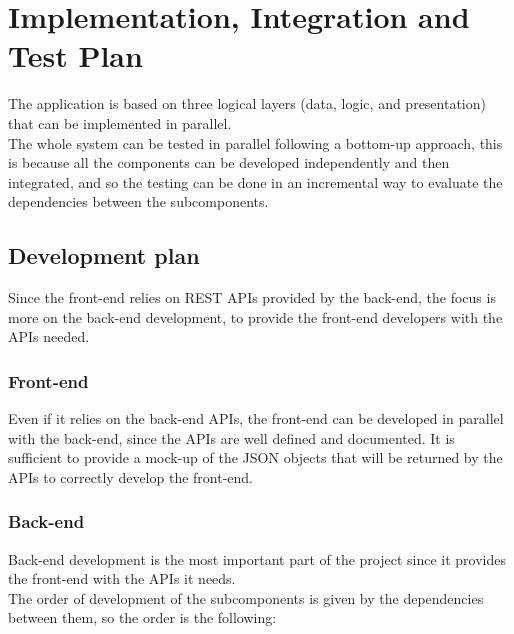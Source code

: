 \chapter{Implementation, Integration and Test Plan}
The application is based on three logical layers (data, logic, and presentation) that can be implemented in parallel.\\
The whole system can be tested in parallel following a bottom-up approach, this is because all the components can be developed independently and then integrated, and so the testing can be done in an incremental way to evaluate the dependencies between the subcomponents.

\section{Development plan}
Since the front-end relies on REST APIs provided by the back-end, the focus is more on the back-end development, to provide the front-end developers with the APIs needed.

\subsection{Front-end}
Even if it relies on the back-end APIs, the front-end can be developed in parallel with the back-end, since the APIs are well defined and documented.
It is sufficient to provide a mock-up of the JSON objects that will be returned by the APIs to correctly develop the front-end.

\subsection{Back-end}
Back-end development is the most important part of the project since it provides the front-end with the APIs it needs.\\
The order of development of the subcomponents is given by the dependencies between them, so the order is the following:

